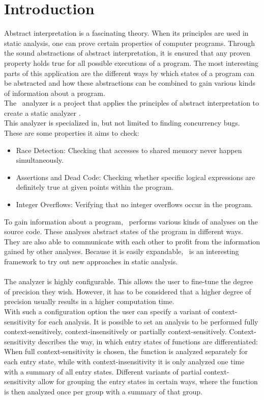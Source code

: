 
\chapter{Introduction}\label{chapter:introduction}
  Abstract interpretation is a fascinating theory. When its principles are used in static analysis, one can prove certain properties of computer programs. Through the sound abstractions of abstract interpretation, it is ensured that any proven property holds true for all possible executions of a program. The most interesting parts of this application are the different ways by which states of a program can be abstracted and how these abstractions can be combined to gain various kinds of information about a program.\\
  The \gob\ analyzer is a project that applies the principles of abstract interpretation to create a static analyzer \parencite{goblintHome}.\\
  This analyzer is specialized in, but not limited to finding concurrency bugs. These are some properties it aims to check:
  \begin{itemize}
    \item Race Detection: Checking that accesses to shared memory never happen simultaneously.
    \item Assertions and Dead Code: Checking whether specific logical expressions are definitely true at given points within the program. 
    \item Integer Overflows: Verifying that no integer overflows occur in the program.
  \end{itemize}
  To gain information about a program, \gob\ performs various kinds of analyses on the source code. These analyses abstract states of the program in different ways. They are also able to communicate with each other to profit from the information gained by other analyses. Because it is easily expandable, \gob\ is an interesting framework to try out new approaches in static analysis.\\
  \\
  The analyzer is highly configurable. This allows the user to fine-tune the degree of precision they wish. However, it has to be considered that a higher degree of precision usually results in a higher computation time.\\
  With such a configuration option the user can specify a variant of context-sensitivity for each analysis. It is possible to set an analysis to be performed fully context-sensitively, context-insensitively or partially context-sensitively. Context-sensitivity describes the way, in which entry states of functions are differentiated: When full context-sensitivity is chosen, the function is analyzed separately for each entry state, while with context-insensitivity it is only analyzed one time with a summary of all entry states. Different variants of partial context-sensitivity allow for grouping the entry states in certain ways, where the function is then analyzed once per group with a summary of that group.\\
